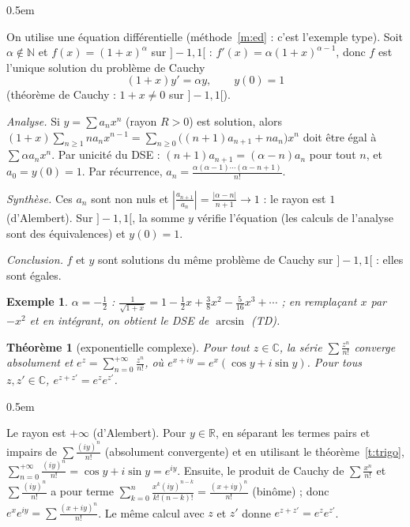 \documentclass[a4paper,11pt]{article}
\makeatletter
\numberwithin{equation}{section}
\numberwithin{figure}{section}
\numberwithin{table}{section}
\theoremstyle{enonce}
\newtheorem{theoreme}[definition]{Théorème}
\theoremstyle{exemple}
\newtheorem{exemple}[definition]{Exemple}
\theoremstyle{remarque}
\renewcommand{\proofname}{Démonstration}
\renewenvironment{proof}[1][\proofname]{\par\pushQED{\qed}\normalfont
  \topsep0.5em\relax\trivlist\item[\hskip\labelsep\sffamily\itshape\color{Gris}#1.]\ignorespaces}
  {\popQED\endtrivlist\@endpefalse}
\newcommand{\R}{\mathbb{R}}
\newcommand{\C}{\mathbb{C}}
\newcommand{\N}{\mathbb{N}}
\makeatother
\begin{document}
\begin{proof}
On utilise une équation différentielle (méthode~\ref{m:ed} : c'est l'exemple type). Soit $\alpha\notin\N$ et $f(x)=(1+x)^\alpha$ sur
$]-1,1[$ : $f'(x)=\alpha(1+x)^{\alpha-1}$, donc $f$ est l'unique solution du problème de Cauchy
\[(1+x)y'=\alpha y,\qquad y(0)=1\]
(théorème de Cauchy : $1+x\neq0$ sur $]-1,1[$).

\emph{Analyse.} Si $y=\sum a_nx^n$ (rayon $R>0$) est solution, alors
$(1+x)\sum_{n\geq1}na_nx^{n-1}=\sum_{n\geq0}\big((n+1)a_{n+1}+na_n\big)x^n$ doit être égal à $\sum\alpha a_nx^n$. Par unicité du DSE :
$(n+1)a_{n+1}=(\alpha-n)a_n$ pour tout $n$, et $a_0=y(0)=1$. Par récurrence, $a_n=\frac{\alpha(\alpha-1)\cdots(\alpha-n+1)}{n!}$.

\emph{Synthèse.} Ces $a_n$ sont non nuls et $\left|\frac{a_{n+1}}{a_n}\right|=\frac{|\alpha-n|}{n+1}\to1$ : le rayon est $1$ (d'Alembert). Sur $]-1,1[$,
la somme $y$ vérifie l'équation (les calculs de l'analyse sont des équivalences) et $y(0)=1$.

\emph{Conclusion.} $f$ et $y$ sont solutions du même problème de Cauchy sur $]-1,1[$ : elles sont égales.
\end{proof}

\begin{exemple}
$\alpha=-\frac12$ : $\frac1{\sqrt{1+x}}=1-\frac12x+\frac38x^2-\frac5{16}x^3+\cdots$ ; en remplaçant $x$ par $-x^2$ et en intégrant, on
obtient le DSE de $\arcsin$ (TD).
\end{exemple}

\begin{theoreme}[exponentielle complexe]\label{t:expC}
Pour tout $z\in\C$, la série $\sum\frac{z^n}{n!}$ converge absolument et $\displaystyle e^z=\sum_{n=0}^{+\infty}\frac{z^n}{n!}$, où
$e^{x+iy}=e^x(\cos y+i\sin y)$. Pour tous $z,z'\in\C$, $e^{z+z'}=e^ze^{z'}$.
\end{theoreme}

\begin{proof}
Le rayon est $+\infty$ (d'Alembert). Pour $y\in\R$, en séparant les termes pairs et impairs de $\sum\frac{(iy)^n}{n!}$ (absolument
convergente) et en utilisant le théorème~\ref{t:trigo}, $\sum_{n=0}^{+\infty}\frac{(iy)^n}{n!}=\cos y+i\sin y=e^{iy}$. Ensuite, le produit de
Cauchy de $\sum\frac{x^n}{n!}$ et $\sum\frac{(iy)^n}{n!}$ a pour terme $\sum_{k=0}^n\frac{x^k(iy)^{n-k}}{k!(n-k)!}=\frac{(x+iy)^n}{n!}$ (binôme) ;
donc $e^xe^{iy}=\sum\frac{(x+iy)^n}{n!}$. Le même calcul avec $z$ et $z'$ donne $e^{z+z'}=e^ze^{z'}$.
\end{proof}
\end{document}
